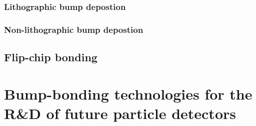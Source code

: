 \subsubsection{Lithographic bump depostion}
\subsubsection{Non-lithographic bump depostion}

\subsection{Flip-chip bonding}

\section{Bump-bonding technologies for the R\&D of future particle detectors}


